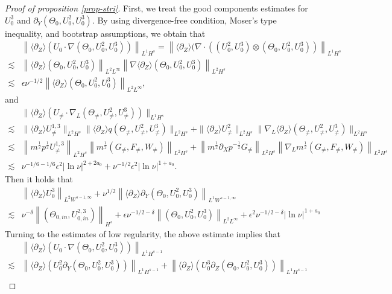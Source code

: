 \documentclass[12pt]{article}
\newcommand{\wtb}{\langle\partial_Z\rangle }
\newcommand{\nm}[2]{\left\| #1 \right\| _{#2} }
\numberwithin{equation}{section}
\begin{document}
\begin{proof}[Proof of proposition \ref{prop-stri}]
	First, we treat the good components estimates for $U^3_0$ and $\partial_Y(\Theta_0,U^2_0,U^3_0)$. By using divergence-free condition, Moser's type inequality, and bootstrap assumptions, we obtain that
	\begin{align*}
		~&\left \| \wtb ( U_0\cdot \nabla (\Theta_0, U_0^2,U_0^3)) \right \| _{L^1H^{s}}=\left \|\wtb ( \nabla \cdot \left( (U_0^2,U_0^3) \otimes (\Theta_0, U_0^2,U_0^3)\right) \right \| _{L^1H^{s}}\\
		\lesssim  & \nm{\wtb(\Theta_0, U_0^2,U_0^3)}{L^2 L^{\infty}} \nm{\nabla \wtb (\Theta_0, U_0^2,U_0^3)}{L^2 H^s} \\
		\lesssim & \epsilon \nu^{-1/2} \nm{ \wtb (\Theta_0, U_0^2,U_0^3)}{L^{2} L^{\infty}},
	\end{align*}
	and 
	\begin{align*}
		&\|\wtb (U_{\neq}\cdot\nabla_L(\Theta_{\neq},U^2_{\neq},U^3_{\neq}))\|_{L^1H^s}\\
		\lesssim&\|\wtb U^{1,3}_{\neq}\|_{L^2H^s}\| \wtb q (\Theta_{\neq},U^2_{\neq},U^3_{\neq})\|_{L^2H^s}+\|\wtb U^2_{\neq}\|_{L^2H^s}\|\nabla_L\wtb(\Theta_{\neq},U^2_{\neq},U^3_{\neq})\|_{L^2H^s}\\
        \lesssim & \nm{m^{\frac12} p^{\frac12} U_{\neq}^{1,3}}{L^2 H^{s}} \nm{ m^{\frac12} (G_{\neq}, F_{\neq}, W_{\neq })}{L^2 H^{s}}+ \nm{m^{\frac12} \partial_X p^{-\frac12} G_{\neq}}{L^2 H^s} \nm{\nabla_L m^{\frac12}  (G_{\neq}, F_{\neq}, W_{\neq })}{L^2 H^{s}} \\
		\lesssim& \nu^{-1/6-1/6}\epsilon^2 |\ln{\nu}|^{2+2a_0} +\nu^{-1/2}\epsilon^2 |\ln{\nu}|^{1+a_0} .
	\end{align*}
	Then it holds that
	\begin{align*}
		~& \left\| \wtb U_0^{3} \right \|_{L^2 W^{s-1,\infty}} + \nu^{1/2} \nm{\wtb \partial_Y (\Theta_0, U_0^2,U_0^3)}{L^1 W^{s-1,\infty}}  \\
		\lesssim &  \nu ^{-\delta} \left \|  ( \Theta_{0,in},U_{0,in}^{2,3})  \right \| _{H^s}+ \epsilon \nu^{-1/2-\delta} \nm{ (\Theta_0, U_0^2,U_0^3)}{L^{2} L^{\infty}} +\epsilon^2 \nu^{-1/2-\delta}  | \ln{\nu}|^{1+a_0}
	\end{align*}
	Turning to the estimates of low regularity, the above estimate implies that
	\begin{align*}
		~&\left \|\wtb ( U_0\cdot \nabla (\Theta_0, U_0^2,U_0^3)) \right \| _{L^1H^{s-1}}\\
		\lesssim  &\left \|\wtb( U_0^2 \partial_Y (\Theta_0, U_0^2,U_0^3)) \right \| _{L^1 H^{s-1}} +\left \|\wtb (U_0^3 \partial_Z (\Theta_0, U_0^2,U_0^3)) \right \| _{L^1 H^{s-1}}  \\

\end{align*}
\end{proof}
\end{document}
